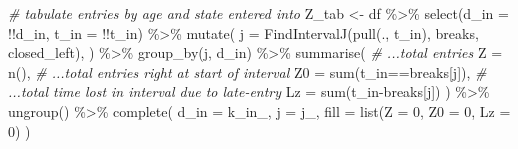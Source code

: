 \documentclass[10pt, twoside]{article}
\newenvironment{Shaded}{}{}
\newcommand{\AttributeTok}[1]{#1}
\newcommand{\CommentTok}[1]{\textit{#1}}
\newcommand{\DecValTok}[1]{#1}
\newcommand{\FunctionTok}[1]{#1}
\newcommand{\NormalTok}[1]{#1}
\newcommand{\OtherTok}[1]{#1}
\newcommand{\SpecialCharTok}[1]{#1}
\begin{document}
\begin{Shaded}
\begin{Highlighting}[]
  \CommentTok{\# tabulate entries by age and state entered into}
\NormalTok{  Z\_tab }\OtherTok{\textless{}{-}}
\NormalTok{    df }\SpecialCharTok{\%\textgreater{}\%}
    \FunctionTok{select}\NormalTok{(}\AttributeTok{d\_in =} \SpecialCharTok{!!}\NormalTok{d\_in, }\AttributeTok{t\_in =} \SpecialCharTok{!!}\NormalTok{t\_in) }\SpecialCharTok{\%\textgreater{}\%}
    \FunctionTok{mutate}\NormalTok{(}
      \AttributeTok{j =} \FunctionTok{FindIntervalJ}\NormalTok{(}\FunctionTok{pull}\NormalTok{(., t\_in), breaks, closed\_left),}
\NormalTok{    ) }\SpecialCharTok{\%\textgreater{}\%}
    \FunctionTok{group\_by}\NormalTok{(j, d\_in) }\SpecialCharTok{\%\textgreater{}\%}
    \FunctionTok{summarise}\NormalTok{(}
      \CommentTok{\# ...total entries}
      \AttributeTok{Z =} \FunctionTok{n}\NormalTok{(),}
      \CommentTok{\# ...total entries right at start of interval}
      \AttributeTok{Z0 =} \FunctionTok{sum}\NormalTok{(t\_in}\SpecialCharTok{==}\NormalTok{breaks[j]),}
      \CommentTok{\# ...total time lost in interval due to late{-}entry}
      \AttributeTok{Lz =} \FunctionTok{sum}\NormalTok{(t\_in}\SpecialCharTok{{-}}\NormalTok{breaks[j])}
\NormalTok{    ) }\SpecialCharTok{\%\textgreater{}\%}
    \FunctionTok{ungroup}\NormalTok{() }\SpecialCharTok{\%\textgreater{}\%}
    \FunctionTok{complete}\NormalTok{(}
      \AttributeTok{d\_in =}\NormalTok{ k\_in\_, }\AttributeTok{j =}\NormalTok{ j\_,}
      \AttributeTok{fill =} \FunctionTok{list}\NormalTok{(}\AttributeTok{Z =} \DecValTok{0}\NormalTok{, }\AttributeTok{Z0 =} \DecValTok{0}\NormalTok{, }\AttributeTok{Lz =} \DecValTok{0}\NormalTok{)}
\NormalTok{    )}


\end{Highlighting}
\end{Shaded}
\end{document}
